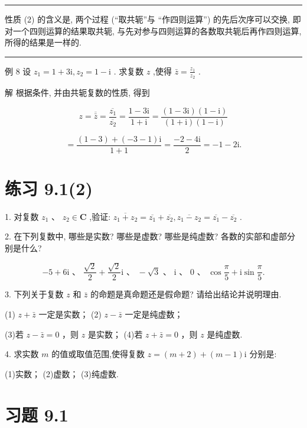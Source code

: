\documentclass[10pt]{article}
\newcommand{\HRule}{\begin{center}\rule{0.9\linewidth}{0.2mm}\end{center}}
\begin{document}
\HRule

性质 (2) 的含义是, 两个过程 (“取共轭”与 “作四则运算”) 的先后次序可以交换, 即对一个四则运算的结果取共轭, 与先对参与四则运算的各数取共轭后再作四则运算, 所得的结果是一样的.

\HRule

例 8 设 \({z}_{1} = 1 + 3\mathrm{i},{z}_{2} = 1 - \mathrm{i}\) . 求复数 \(z\) ,使得 \(\bar{z} = \frac{{z}_{1}}{{z}_{2}}\) .

解 根据条件, 并由共轭复数的性质, 得到

\[
z = \overline{\bar{z}} = \frac{\overline{{z}_{1}}}{\overline{{z}_{2}}} = \frac{1 - 3\mathrm{i}}{1 + \mathrm{i}} = \frac{\left( {1 - 3\mathrm{i}}\right) \left( {1 - \mathrm{i}}\right) }{\left( {1 + \mathrm{i}}\right) \left( {1 - \mathrm{i}}\right) }
\]

\[
= \frac{\left( {1 - 3}\right)  + \left( {-3 - 1}\right) \mathrm{i}}{1 + 1} = \frac{-2 - 4\mathrm{i}}{2} =  - 1 - 2\mathrm{i}.
\]

\section*{练习 9.1(2)}

1. 对复数 \({z}_{1}\text{ 、 }{z}_{2} \in  \mathbf{C}\) ,验证: \(\overline{{z}_{1} + {z}_{2}} = \overline{{z}_{1}} + \overline{{z}_{2}},\overline{{z}_{1} - {z}_{2}} = \overline{{z}_{1}} - \overline{{z}_{2}}\) .

2. 在下列复数中, 哪些是实数? 哪些是虚数? 哪些是纯虚数? 各数的实部和虚部分别是什么?

\[
- 5 + 6\mathrm{i}\text{ 、 }\frac{\sqrt{2}}{2} + \frac{\sqrt{2}}{2}\mathrm{i}\text{ 、 } - \sqrt{3}\text{ 、 }\mathrm{i}\text{ 、 }0\text{ 、 }\cos \frac{\pi }{5} + \mathrm{i}\sin \frac{\pi }{5}.
\]

3. 下列关于复数 \(z\) 和 \(\bar{z}\) 的命题是真命题还是假命题? 请给出结论并说明理由.

(1) \(z + \bar{z}\) 一定是实数； (2) \(z - \bar{z}\) 一定是纯虚数；

(3)若 \(z - \bar{z} = 0\) ，则 \(z\) 是实数； (4)若 \(z + \bar{z} = 0\) ，则 \(z\) 是纯虚数.

4. 求实数 \(m\) 的值或取值范围,使得复数 \(z = \left( {m + 2}\right)  + \left( {m - 1}\right) \mathrm{i}\) 分别是:

(1)实数； (2)虚数； (3)纯虚数.

\section*{习题 9.1}
\end{document}
